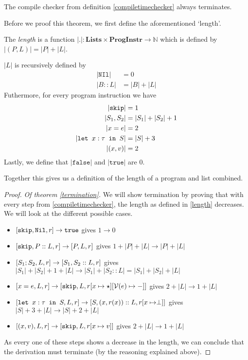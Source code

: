 \begin{theorem}
\label{termination}
The compile checker from definition \ref{compiletimechecker} always terminates.
\end{theorem}

Before we proof this theorem, we first define the aforementioned `length'. 

\begin{definition}
\label{length}
The \emph{length} is a function $|.|: \textbf{Lists} \times \textbf{ProgInstr} \to \mathbb{N}$ which is defined by $|(P,L)| = |P|+|L|$.

$|L|$ is recursively defined by 
\begin{align*}
|\texttt{NIl}| & = 0\\
|B::L| & = |B| + |L|
\end{align*}
Futhermore, for every program instruction we have
\begin{align*}
|\texttt{skip}| & = 1\\
|S_1, S_2| & = |S_1| + |S_2| + 1 \\
|x=e| & = 2\\
|\texttt{let }x : \tau \texttt{ in } S| & = |S| + 3 \\
|(x,v)| & = 2 \\
\end{align*}
Lastly, we define that $|\texttt{false}|$ and $|\texttt{true}|$ are 0.

Together this gives us a definition of the length of a program and list combined.
\end{definition}

\begin{proof}
\emph{Of theorem \ref{termination}.}
We will show termination by proving that with every step from \ref{compiletimechecker}, the length as defined in \ref{length} decreases. We will look at the different possible cases.

\begin{itemize}
    \item $[ \texttt{skip}, \texttt{Nil}, r ] \to \texttt{true}$ gives $1 \to 0$
    \item $[ \texttt{skip}, P::L,  r ] \to [ P, L, r ]$ gives $1 + |P| + |L| \to |P| + |L|$
    \item $[ S_1; S_2, L, r ] \to [ S_1, S_2::L, r ]$ gives $|S_1| + |S_2| + 1 + |L| \to |S_1| + |S_2::L| = |S_1| + |S_2| + |L|$
    \item $[ x=e, L, r ] \to [ \texttt{skip}, L, r[x\mapsto \star][\mathcal{V}(e) \mapsto -] ]$ gives $2 + |L| \to 1 + |L|$
    \item $[ \texttt{let }x : \tau \texttt{ in } S, L, r ] \to [ S, (x,r(x))::L, r[x\mapsto \perp] ]$ gives $|S|+3+|L|\to |S|+2+|L|$
    \item $[ (x,v), L, r ] \to [ \texttt{skip}, L, r[x \mapsto v] ]$ gives $2 + |L| \to 1 + |L|$
\end{itemize}
As every one of these steps shows a decrease in the length, we can conclude that the derivation must terminate (by the reasoning explained above).
\end{proof}


